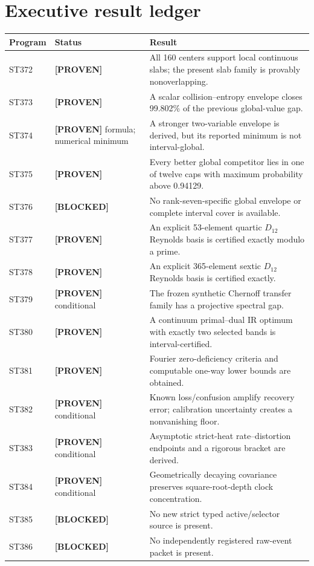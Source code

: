 \documentclass[11pt,a4paper]{article}
\newcommand{\Proven}{\textcolor{proved}{\textbf{[PROVEN]}}}
\newcommand{\Blocked}{\textcolor{blocked}{\textbf{[BLOCKED]}}}
\begin{document}
\section{Executive result ledger}
\small
\begin{longtable}{>{\raggedright\arraybackslash}p{}>{\raggedright\arraybackslash}p{}>{\raggedright\arraybackslash}p{}}
\toprule Program&Status&Result\\\midrule\endhead
ST372&\Proven&All 160 centers support local continuous slabs; the present slab family is provably nonoverlapping.\\
ST373&\Proven&A scalar collision--entropy envelope closes 99.802\% of the previous global-value gap.\\
ST374&\Proven{} formula; numerical minimum&A stronger two-variable envelope is derived, but its reported minimum is not interval-global.\\
ST375&\Proven&Every better global competitor lies in one of twelve caps with maximum probability above 0.94129.\\
ST376&\Blocked&No rank-seven-specific global envelope or complete interval cover is available.\\
ST377&\Proven&An explicit 53-element quartic $D_{12}$ Reynolds basis is certified exactly modulo a prime.\\
ST378&\Proven&An explicit 365-element sextic $D_{12}$ Reynolds basis is certified exactly.\\
ST379&\Proven{} conditional&The frozen synthetic Chernoff transfer family has a projective spectral gap.\\
ST380&\Proven&A continuum primal--dual IR optimum with exactly two selected bands is interval-certified.\\
ST381&\Proven&Fourier zero-deficiency criteria and computable one-way lower bounds are obtained.\\
ST382&\Proven{} conditional&Known loss/confusion amplify recovery error; calibration uncertainty creates a nonvanishing floor.\\
ST383&\Proven{} conditional&Asymptotic strict-heat rate--distortion endpoints and a rigorous bracket are derived.\\
ST384&\Proven{} conditional&Geometrically decaying covariance preserves square-root-depth clock concentration.\\
ST385&\Blocked&No new strict typed active/selector source is present.\\
ST386&\Blocked&No independently registered raw-event packet is present.\\
\bottomrule
\end{longtable}\normalsize
\end{document}
